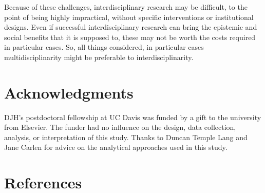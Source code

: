\documentclass[
  11pt,
]{article}
\begin{document}
Because of these challenges, interdisciplinary research may be difficult, to the point of being highly impractical, without specific interventions or institutional designs. Even if successful interdisciplinary research can bring the epistemic and social benefits that it is supposed to, these may not be worth the costs required in particular cases. So, all things considered, in particular cases multidisciplinarity might be preferable to interdisciplinarity.

\hypertarget{acknowledgments}{%
\section{Acknowledgments}\label{acknowledgments}}

DJH's postdoctoral fellowship at UC Davis was funded by a gift to the university from Elsevier. The funder had no influence on the design, data collection, analysis, or interpretation of this study. Thanks to Duncan Temple Lang and Jane Carlen for advice on the analytical approaches used in this study.

\hypertarget{references}{%
\section{References}\label{references}}
\end{document}
